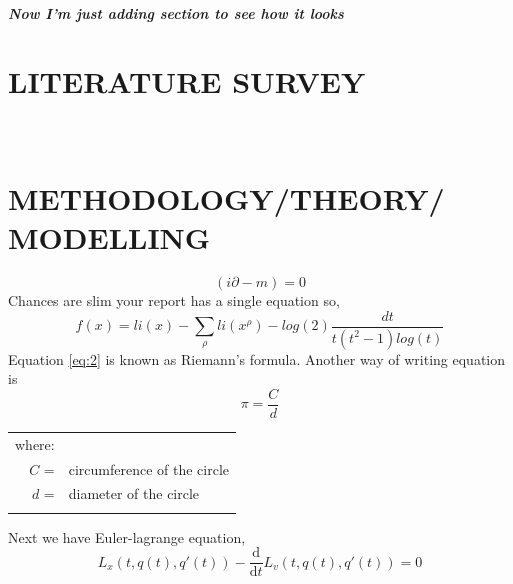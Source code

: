 \documentclass[12pt,a4paper]{report}
\begin{document}
\paragraph{Now I'm just adding section to see how it looks}

\lipsum[1]


\chapter{LITERATURE SURVEY}

\lipsum[3-8] \\

\lipsum
\chapter{\MakeUppercase{Methodology/Theory/ Modelling}}
\lipsum[1]
\[(i \partial -m) = 0 \]
Chances are slim your report has a single equation so,
\begin{equation}
    \label{eq:2}
    f(x) = li(x)-\sum_{\rho}li(x^{\rho}) -  log(2) \frac{dt}{t(t^{2}-1)log(t)}
\end{equation}
Equation \ref{eq:2} is known as Riemann's formula. Another way of writing equation is \\
\begin{equation}
    \label{eq:3}
    \pi = \frac{C}{d}
\end{equation}
\hspace*{5cm} %
\begin{tabular}{rl}
where:\\
    $C$ =& circumference of the circle \\
    $d$ =& diameter of the circle  \\
    \\
\end{tabular}

Next we have Euler-lagrange equation, 
\begin{equation}
    \label{eq:4}
    L_{x}(t,q(t),q'(t)) - \frac{\mathrm{d}}
    {\mathrm{d}t} L_{v}(t,q(t),q'(t))= 0
\end{equation}
\end{document}
